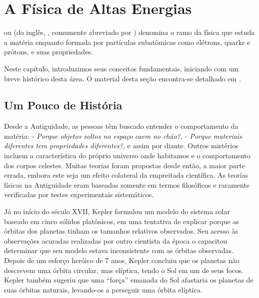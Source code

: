 \typeout{ ====================================================================}
\typeout{ ====================================================================}

\chapter{A Física de Altas Energias}
\label{chap:introducao}

 ou  (do inglês,
, comumente abreviado por ) denomina o
ramo da física que estuda a matéria enquanto formada por partículas
subatômicas como elétrons, quarks e prótons, e suas propriedades.

Neste capítulo, introduzimos seus conceitos fundamentais, iniciando com um
breve histórico desta área. O material desta seção encontra-se detalhado em
\cite{partadv}.


\section{Um Pouco de História}

Desde a Antiguidade, as pessoas têm buscado entender o comportamento da
matéria: \textit{- Porque objetos soltos no espaço caem no chão?}, \textit{-
Porque materiais diferentes tem propriedades diferentes?}, e assim por
diante. Outros mistérios incluem a característica do próprio universo onde
habitamos e o comportamento dos corpos celestes. Muitas teorias foram
propostas desde então, a maior parte errada, embora este seja um efeito
colateral da empreitada científica. As teorías físicas na Antiguidade eram
baseadas somente em termos filosóficos e raramente verificadas por testes
experimentais sistemáticos.

Já no início do século XVII, Kepler formulou um modelo do sistema solar
baseado em cinco sólidos platônicos, em uma tentativa de explicar porque as
órbitas dos planetas tinham os tamanhos relativos observados. Seu acesso às
observações acuradas realizadas por outro cientista da época o capacitou
determinar que seu modelo estava inconsistente com as órbitas
observadas. Depois de um esforço heróico de 7 anos, Kepler concluiu que os
planetas não descrevem uma órbita circular, mas elíptica, tendo o Sol em um de
seus focos. Kepler também sugeriu que uma ``força'' emanada do Sol afastaria
os planetas de suas órbitas naturais, levando-os a perseguir uma órbita
elíptica.

